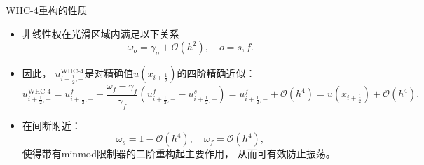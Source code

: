 \documentclass[aspectratio=169]{beamer}
\begin{document}
\begin{frame}{WHC-4重构的性质}
  
  \begin{itemize}[<+->]
    \item 非线性权在光滑区域内满足以下关系
          \begin{equation*}
            \omega_{{o}}= \gamma_{{o}}+ {\mathcal{O}}(h^2) , \quad {{o}}={{s}}, {{f}}.
          \end{equation*}
          
    \item 因此，
          $u_{i+\frac{1}{2},-}^{\text{WHC-4}}$是对精确值$u(x_{i+\frac{1}{2}})$的四阶精确近似：
          \begin{equation*}
            u_{i+\frac{1}{2},-}^{\text{WHC-4}}= u_{i+\frac{1}{2},-}^{{f}}+ \frac{\omega_{{f}}- \gamma_{{f}}}{\gamma_{{f}}}\left(u_{i+\frac{1}{2},-}^{{f}}-u_{i+\frac{1}{2},-}^{{s}}\right) = u_{i+\frac{1}{2},-}^{{f}}+ {\mathcal{O}}(h^4)= u(x_{i+\frac{1}{2}})+{\mathcal{O}}(h^4).
          \end{equation*}
          
    \item 在间断附近：
          \begin{equation*}
            \omega_{{s}}= 1-{\mathcal{O}}(h^4), \quad \omega_{{f}}= {\mathcal{O}}(h^4),
          \end{equation*}
          使得带有minmod限制器的二阶重构起主要作用，
          从而可有效防止振荡。 
  \end{itemize}
  
\end{frame}
\end{document}

